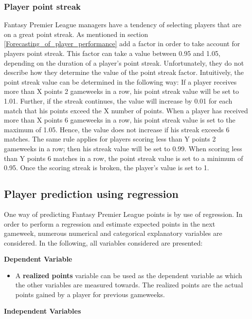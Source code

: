 \subsubsection{Player point streak}
Fantasy Premier League managers have a tendency of selecting players that are on a great point streak. As mentioned in section \ref{Forecasting_of_player_performance} \cite{Bonomo} add a factor in order to take account for players point streak. This factor can take a value between 0.95 and 1.05, depending on the duration of a player's point streak. Unfortunately, they do not describe how they determine the value of the point streak factor. Intuitively, the point streak value can be determined in the following way: 
\newpar
If a player receives more than X points 2 gameweeks in a row, his point streak value will be set to 1.01. Further, if the streak continues, the value will increase by 0.01 for each match that his points exceed the X number of points. When a player has received more than X points 6 gameweeks in a row, his point streak value is set to the maximum of 1.05. Hence, the value does not increase if his streak exceeds 6 matches. The same rule applies for players scoring less than Y points 2 gameweeks in a row; then his streak value will be set to 0.99. When scoring less than Y points 6 matches in a row, the point streak value is set to a minimum of 0.95. Once the scoring streak is broken, the player's value is set to 1. 


\subsection{Player prediction using regression}

One way of predicting Fantasy Premier League points is by use of regression. In order to perform a regression and estimate expected points in the next gameweek, numerous numerical and categorical explanatory variables are considered. In the following, all variables considered are presented: 

\newpar

\textbf{Dependent Variable}
\begin{itemize}
    \item A \textbf{realized points} variable can be used as the dependent variable as which the other variables are measured towards. The realized points are the actual points gained by a player for previous gameweeks.
\end{itemize}

\textbf{Independent Variables}

